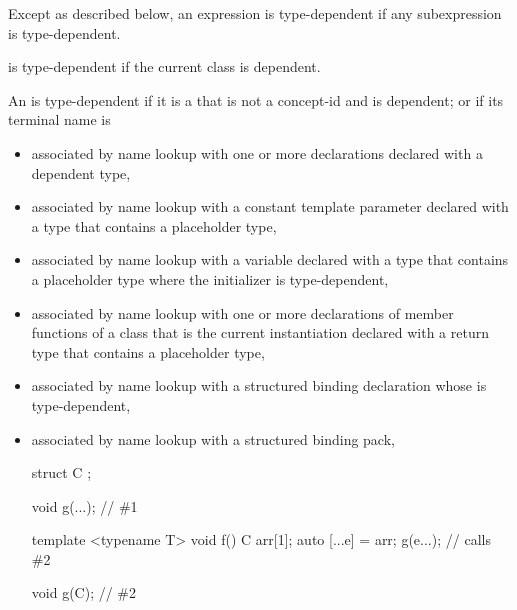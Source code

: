 \pnum
Except as described below, an expression is type-dependent if any
subexpression is type-dependent.

\pnum
{}
is type-dependent if the current class is
dependent.

\pnum
An  is type-dependent
if it is a  that is not a concept-id and is dependent;
or if its terminal name is
\begin{itemize}
\item
associated by name lookup with one or more declarations
declared with a dependent type,
\item
associated by name lookup with
a constant template parameter
declared with a type
that contains a placeholder type,
\item
associated by name lookup with
a variable declared with a type that contains a placeholder type
where the initializer is type-dependent,
\item
associated by name lookup with one or more
declarations of member functions of a class that is the current instantiation
declared with a return type that contains a placeholder type,
\item
associated by name lookup with
a structured binding declaration whose
 is type-dependent,
\item
associated by name lookup with a structured binding pack,
\begin{example}
\begin{codeblock}
struct C { };

void g(...);            // \#1

template <typename T>
void f() {
  C arr[1];
  auto [...e] = arr;
  g(e...);              // calls \#2
}

void g(C);              // \#2


\end{codeblock}
\end{example}
\end{itemize}
